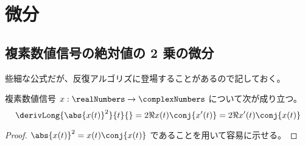 \part{微分}
    \chapter{複素数値信号の絶対値の 2 乗の微分}
        些細な公式だが、反復アルゴリズに登場することがあるので記しておく。
        \begin{shadebox}
            複素数値信号 $x:\realNumbers\to\complexNumbers$ について次が成り立つ。
            \[ \derivLong{\abs{x(t)}^2}{t}{} = 2\Re{x(t)\conj{x'(t)}} = 2\Re{x'(t)\conj{x(t)}} \]
        \end{shadebox}
        \begin{proof}
            $\abs{x(t)}^2 = x(t)\conj{x(t)}$ であることを用いて容易に示せる。
        \end{proof}
